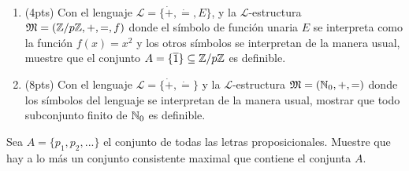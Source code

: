 \begin{prob}
    \
    \begin{enumerate}[label=(\alph*)]
        \item (4pts) Con el lenguaje \(\mathcal{L}=\{\dot+,\dot=,E\}\), y la \(\mathcal{L}\)-estructura \(\mathfrak{{M}}=(\mathbb{Z}/p\mathbb{Z},+,=,f)\) donde el símbolo de función unaria \(E\) se interpreta como la función \(f(x)=x^2\) y los otros símbolos se interpretan de la manera usual, muestre que el conjunto \(A=\{\overline{1}\}\subseteq\mathbb{Z}/p\mathbb{Z}\) es definible.
        \item (8pts) Con el lenguaje \(\mathcal{L}=\{\dot+,\dot=\}\) y la \(\mathcal{L}\)-estructura \(\mathfrak{M}=(\mathbb{N}_0,+,=)\) donde los símbolos del lenguaje se interpretan de la manera usual, mostrar que todo subconjunto finito de \(\mathbb{N}_0\) es definible.
    \end{enumerate}
\end{prob}

\begin{sol}
    
\end{sol}

\begin{prob}[Bonus]
    Sea \(A=\{p_1,p_2,...\}\) el conjunto de todas las letras proposicionales. Muestre que hay a lo más un conjunto consistente maximal que contiene el conjunta \(A\).
\end{prob}

\begin{sol}
    
\end{sol}

